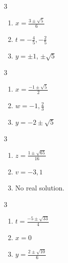 \documentclass{ximera}
\begin{document}
	\author{Stitz-Zeager}


\begin{multicols}{3}
\begin{enumerate}

\item  $x = \frac{3 \pm \sqrt{5}}{6}$ 
\item  $t = -\frac{4}{5}, -\frac{2}{5}$ 
\item  $y = \pm 1$, $\pm \sqrt{5}$ 
\setcounter{HW}{\value{enumi}}
\end{enumerate}
\end{multicols}

\begin{multicols}{3}
\begin{enumerate}
\setcounter{enumi}{\value{HW}}

\item $x = \frac{-1 \pm \sqrt{5}}{2}$
\item $w = -1, \frac{2}{3}$ 
\item $y = -2 \pm \sqrt{5}$
\setcounter{HW}{\value{enumi}}
\end{enumerate}
\end{multicols}

\begin{multicols}{3}
\begin{enumerate}
\setcounter{enumi}{\value{HW}}

\item $z = \frac{1 \pm \sqrt{65}}{16}$
\item  $v = -3, 1$
\item No real solution.

\setcounter{HW}{\value{enumi}}
\end{enumerate}
\end{multicols}

\begin{multicols}{3}
\begin{enumerate}
\setcounter{enumi}{\value{HW}}

\item $t = \frac{-5 \pm \sqrt{33}}{4}$
\item $x = 0$ 
\item $y = \frac{2 \pm \sqrt{10}}{6}$

\setcounter{HW}{\value{enumi}}
\end{enumerate}
\end{multicols}
\end{document}
